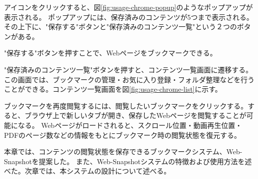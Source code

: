 アイコンをクリックすると、図\ref{fig:usage-chrome-popup}のようなポップアップが表示される。
ポップアップには、保存済みのコンテンツが5つまで表示される。
その上下に、"保存する"ボタンと"保存済みのコンテンツ一覧"という２つのボタンがある。

"保存する"ボタンを押すことで、Webページをブックマークできる。



"保存済みのコンテンツ一覧"ボタンを押すと、コンテンツ一覧画面に遷移する。
この画面では、ブックマークの管理・お気に入り登録・フォルダ整理などを行うことができる。コンテンツ一覧画面を図\ref{fig:usage-chrome-list}に示す。



ブックマークを再度閲覧するには、閲覧したいブックマークをクリックする。すると、ブラウザ上で新しいタブが開き、保存したWebページを閲覧することが可能になる。
Webページがロードされると、スクロール位置・動画再生位置・PDFのページ数などの情報をもとにブックマーク時の閲覧状態を復元する。

本章では、コンテンツの閲覧状態を保存できるブックマークシステム、Web-Snapshotを提案した。
また、Web-Snapshotシステムの特徴および使用方法を述べた。次章では、本システムの設計について述べる。

